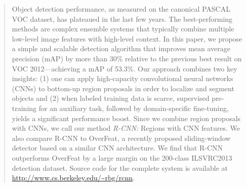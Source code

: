\begin{abstract}
Object detection performance, as measured on the canonical PASCAL VOC dataset, has plateaued in the last few years.
The best-performing methods are complex ensemble systems that typically combine multiple low-level image features with high-level context.
In this paper, we propose a simple and scalable detection algorithm that improves mean average precision (mAP) by more than 30\% relative to the previous best result on VOC 2012---achieving a mAP of 53.3\%.
Our approach combines two key insights: (1) one can apply high-capacity convolutional neural networks (CNNs) to bottom-up region proposals in order to localize and segment objects and (2) when labeled training data is scarce, supervised pre-training for an auxiliary task, followed by domain-specific fine-tuning, yields a significant performance boost.
Since we combine region proposals with CNNs, we call our method \emph{R-CNN:} Regions with CNN features.
We also compare R-CNN to OverFeat, a recently proposed sliding-window detector based on a similar CNN architecture.
We find that R-CNN outperforms OverFeat by a large margin on the 200-class ILSVRC2013 detection dataset.
Source code for the complete system is available at 
\url{http://www.cs.berkeley.edu/~rbg/rcnn}.
\vspace{-1em}
\end{abstract}
